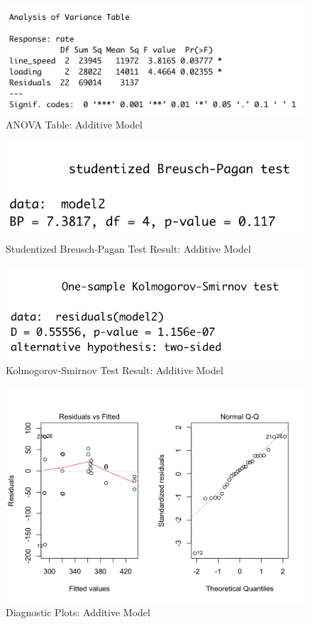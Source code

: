 \documentclass[11pt,a4paper]{article}
\begin{document}
\begin{figure}[htb]
    \centering
    \includegraphics[scale=0.8]{add1.png}
    \caption{ANOVA Table: Additive Model}
    \label{}
\end{figure}

\begin{figure}[htb]
    \centering
    \includegraphics[scale=1]{BP1}
    \caption{Studentized Breusch-Pagan Test Result: Additive Model}
    \label{}
\end{figure}
\begin{figure}[htb]
    \centering
    \includegraphics[scale=1]{KS1}
    \caption{Kolmogorov-Smirnov Test Result: Additive Model}
    \label{}
\end{figure}
\begin{figure}[htb]
    \centering
    \includegraphics[scale=0.3]{DP1}
    \caption{Diagnostic Plots: Additive Model}
    \label{}
\end{figure}
\end{document}
